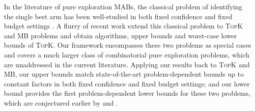 \documentclass{article}
\newcommand{\MultiIdent}{\textsc{TopK}\xspace}
\newcommand{\MultiBandit}{\textsc{MB}\xspace}
\begin{document}
In the literature of pure exploration MABs, the classical problem of identifying the single best arm has been well-studied in both fixed confidence and fixed budget settings \citep{mannor2004sample,even2006action,bubeck2010pure,audibert2010best,gabillon2012best,jamieson2013lil,jamieson2014best}.
A flurry of recent work extend this classical problem to \MultiIdent and \MultiBandit problems and obtain algorithms, upper bounds \citep{kalyanakrishnan2010efficient,kalyanakrishnan2012pac,zhou2014optimal,bubeck2013multiple,NIPS2011_4478,gabillon2012best,kaufmann2013information} and worst-case lower bounds of \MultiIdent \citep{kalyanakrishnan2012pac,zhou2014optimal}.
Our framework encompasses these two problems as special cases and covers a much larger class of combinatorial pure exploration problems, which are unaddressed in the current literature.
Applying our results back to \MultiIdent and \MultiBandit, our upper bounds match state-of-the-art problem-dependent bounds up to constant factors \citep{gabillon2012best,bubeck2013multiple,kalyanakrishnan2012pac} in both fixed confidence and fixed budget settings; and our lower bound provides the first problem-dependent lower bounds for these two problems, which are conjectured earlier by \citet{kalyanakrishnan2012pac} and \citet{bubeck2013multiple}.

\vspace{-1em}
\end{document}
